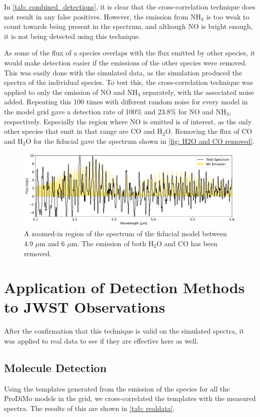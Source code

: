 \documentclass[twoside, single, authoryear, semicolon, 12pt]{lion-msc}
\newcommand{\4}{$_4$}
\newcommand{\3}{$_3$}
\newcommand{\2}{$_2$}
\begin{document}
In \autoref{tab: combined_detections}, it is clear that the cross-correlation technique does not result in any false positives. However, the emission from NH\3 is too weak to count towards being present in the spectrum, and although NO is bright enough, it is not being detected using this technique. 

As some of the flux of a species overlaps with the flux emitted by other species, it would make detection easier if the emissions of the other species were removed. This was easily done with the simulated data, as the simulation produced the spectra of the individual species. To test this, the cross-correlation technique was applied to only the emission of NO and NH\3 separately, with the associated noise added. Repeating this 100 times with different random noise for every model in the model grid gave a detection rate of 100\% and 23.8\% for NO and NH\3, respectively.  Especially the region where NO is emitted is of interest, as the only other species that emit in that range are CO and H\2O. Removing the flux of CO and H\2O for the fiducial gave the spectrum shown in \autoref{fig: H2O and CO removed}.

\begin{figure}[H]
    \centering
    \includegraphics[width=\linewidth]{Figures/H2O_CO_removed.pdf}
    \caption{A zoomed-in region of the spectrum of the fiducial model between 4.9 $\mu$m and 6 $\mu$m. The emission of both H\2O and CO has been removed.}
    \label{fig: H2O and CO removed}
\end{figure}

\section{Application of Detection Methods to JWST Observations}
After the confirmation that this technique is valid on the simulated spectra, it was applied to real data to see if they are effective here as well.

\subsection{Molecule Detection}
Using the templates generated from the emission of the species for all the ProDiMo models in the grid, we cross-correlated the templates with the measured spectra. The results of this are shown in \autoref{tab: realdata}.
\end{document}
